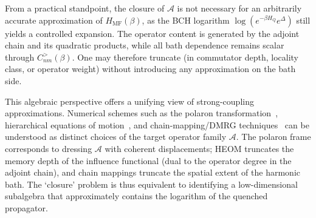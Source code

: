 From a practical standpoint, the closure of $\mathcal A$ is not necessary for an arbitrarily accurate approximation of $H_{\mathrm{MF}}(\beta)$, as the BCH logarithm $\log(e^{-\beta H_Q}e^\Delta)$ still yields a controlled expansion. The operator content is generated by the adjoint chain and its quadratic products, while all bath dependence remains scalar through $C^{>}_{nm}(\beta)$. One may therefore truncate (in commutator depth, locality
class, or operator weight) without introducing any approximation on the bath side.

This algebraic perspective offers a unifying view of strong-coupling approximations. Numerical schemes such as the polaron transformation~\cite{weissQuantumDissipativeSystems2012,nazirReactionCoordinateMapping2018}, hierarchical equations of motion~\cite{tanimuraReducedHierarchicalEquations2014}, and chain-mapping/DMRG techniques~\cite{XuVadimovStockburgerAnkerhold2026} can be understood as distinct choices of the target operator family $\mathcal{A}$. The polaron frame corresponds to dressing $\mathcal{A}$ with coherent displacements; HEOM truncates the memory depth of the influence functional (dual to the operator degree in the adjoint chain), and chain mappings truncate the spatial extent of the harmonic bath. The `closure' problem is thus equivalent to identifying a low-dimensional subalgebra that approximately contains the logarithm of the quenched propagator.

